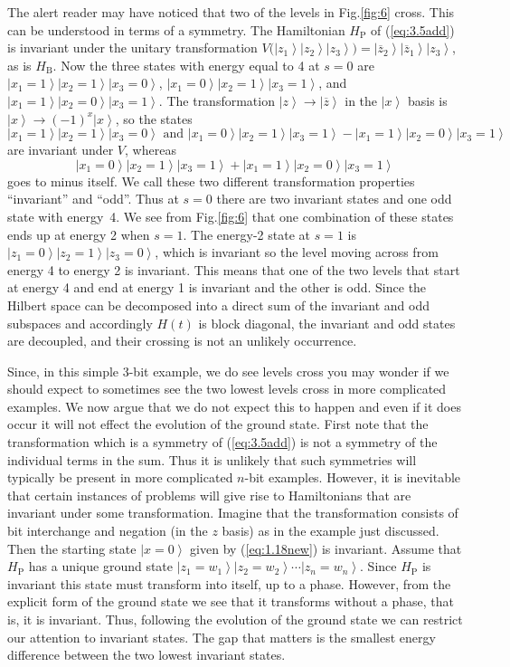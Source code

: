 \documentclass[twoside]{article}
\newcommand{\ket}[1]{\left|#1\right\rangle}
\newcommand{\refEq}[1]{(\ref{eq:#1})}
\newcommand{\refFig}[1]{Fig.\thinspace\ref{fig:#1}}
\newcommand{\rP}{{\mathrm{P}}}
\newcommand{\rB}{{\mathrm{B}}}
\let\bar\overline
\numberwithin{equation}{section}
\begin{document}
The alert reader may have noticed that two of the levels in \refFig6 cross. 
This can be understood in terms of a symmetry.  The Hamiltonian $H_\rP$
of \refEq{3.5add} is invariant under the unitary transformation
$V\bigl(\ket{z_1}\ket{z_2}\ket{z_3}\bigr) =
\ket{\bar{z}_2}\ket{\bar{z}_1}\ket{z_3}$, as is $H_\rB$.  Now the three
states with energy equal to 4 at $s=0$ are
$\ket{x_1=1}\ket{x_2=1}\ket{x_3=0}$,
$\ket{x_1=0}\ket{x_2=1}\ket{x_3=1}$, and
$\ket{x_1=1}\ket{x_2=0}\ket{x_3=1}$.  The transformation $\ket{z} \to
\ket{\bar z}$ in the $\ket{x}$ basis is $\ket{x} \to (-1)^x \ket{x}$, so the
states
$$
\ket{x_1=1}\ket{x_2=1}\ket{x_3=0}\mbox{ and }
\ket{x_1=0}\ket{x_2=1}\ket{x_3=1} - \ket{x_1=1}\ket{x_2=0}\ket{x_3=1}
$$
 are invariant under $V$, whereas
$$
\ket{x_1=0}\ket{x_2=1}\ket{x_3=1} + \ket{x_1=1}\ket{x_2=0}\ket{x_3=1}
$$ goes to minus itself.  We call these two different transformation
properties ``invariant'' and ``odd''.  Thus at $s=0$ there are two invariant
states and one odd state with energy~4.  We see from \refFig6 that one
combination of these states ends up at energy 2 when $s=1$.  The energy-2
state at $s=1$ is $\ket{z_1=0}\ket{z_2=1}\ket{z_3=0}$,
 which is invariant so the level moving across from energy 4 to energy 2 is
invariant.
 This means that one of the two levels
 that start at energy 4 and end at energy 1 is invariant and the other is
odd.   Since the Hilbert space can be decomposed into  a direct sum of the
invariant and odd subspaces and accordingly $H(t)$ is block diagonal, the
invariant and odd states
 are decoupled, and their crossing is not an unlikely occurrence.

Since, in this simple 3-bit example, we do see levels cross you may wonder
if we should expect to sometimes see the two lowest levels cross in more
complicated examples.  We now argue that we do not expect this to happen
and even if it does occur it will not effect the evolution of the ground
state.  First note that the transformation which is a symmetry of
\refEq{3.5add} is not a symmetry of the individual terms in the sum.  Thus
it is unlikely that such symmetries will typically be present in more
complicated $n$-bit examples.  However, it is inevitable that certain
instances of problems will give rise to Hamiltonians that are invariant
under some transformation.   Imagine that the transformation consists of
bit interchange and negation (in the $z$ basis) as in the example just
discussed.  Then the starting state $\ket{x=0}$ given by
\refEq{1.18new} is invariant.  Assume that $H_\rP$ has a unique ground
state $\ket{z_1 = w_1}\ket{z_2 = w_2} \cdots \ket{z_n = w_n}$.  Since
$H_\rP$ is invariant this state must transform into itself, up to a phase. 
However, from the explicit form of the ground state we see that it
transforms without a phase, that is, it is invariant.  Thus, following the
evolution of the ground state we can restrict our attention to invariant
states. The gap that matters is the smallest energy difference between the
two lowest invariant states. 
\end{document}
